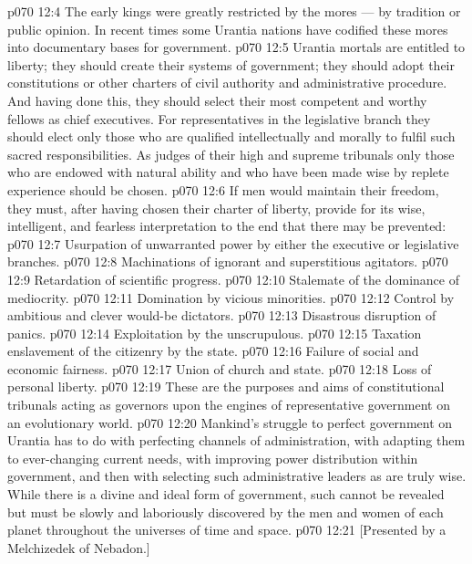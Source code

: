 \vs p070 12:4 The early kings were greatly restricted by the mores --- by tradition or public opinion. In recent times some Urantia nations have codified these mores into documentary bases for government.
\vs p070 12:5 \pc Urantia mortals are entitled to liberty; they should create their systems of government; they should adopt their constitutions or other charters of civil authority and administrative procedure. And having done this, they should select their most competent and worthy fellows as chief executives. For representatives in the legislative branch they should elect only those who are qualified intellectually and morally to fulfil such sacred responsibilities. As judges of their high and supreme tribunals only those who are endowed with natural ability and who have been made wise by replete experience should be chosen.
\vs p070 12:6 If men would maintain their freedom, they must, after having chosen their charter of liberty, provide for its wise, intelligent, and fearless interpretation to the end that there may be prevented:
\vs p070 12:7 \bibnobreakspace Usurpation of unwarranted power by either the executive or legislative branches.
\vs p070 12:8 \bibnobreakspace Machinations of ignorant and superstitious agitators.
\vs p070 12:9 \bibnobreakspace Retardation of scientific progress.
\vs p070 12:10 \bibnobreakspace Stalemate of the dominance of mediocrity.
\vs p070 12:11 \bibnobreakspace Domination by vicious minorities.
\vs p070 12:12 \bibnobreakspace Control by ambitious and clever would\hyp{}be dictators.
\vs p070 12:13 \bibnobreakspace Disastrous disruption of panics.
\vs p070 12:14 \bibnobreakspace Exploitation by the unscrupulous.
\vs p070 12:15 \bibnobreakspace Taxation enslavement of the citizenry by the state.
\vs p070 12:16 \bibnobreakspace Failure of social and economic fairness.
\vs p070 12:17 \bibnobreakspace Union of church and state.
\vs p070 12:18 \bibnobreakspace Loss of personal liberty.
\vs p070 12:19 \pc These are the purposes and aims of constitutional tribunals acting as governors upon the engines of representative government on an evolutionary world.
\vs p070 12:20 Mankind’s struggle to perfect government on Urantia has to do with perfecting channels of administration, with adapting them to ever\hyp{}changing current needs, with improving power distribution within government, and then with selecting such administrative leaders as are truly wise. While there is a divine and ideal form of government, such cannot be revealed but must be slowly and laboriously discovered by the men and women of each planet throughout the universes of time and space.
\vsetoff
\vs p070 12:21 [Presented by a Melchizedek of Nebadon.]
\quizlink
